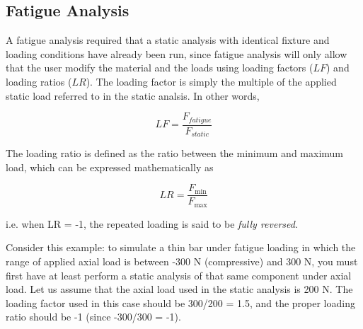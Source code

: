 \documentclass[
10pt,
a4paper,
openany,
svgnames,
]{book}
\begin{document}
\subsection{Fatigue Analysis}

A fatigue analysis required that a static analysis with identical fixture and loading conditions have already been run, since fatigue analysis will only allow that the user modify the material and the loads using loading factors ($LF$) and loading ratios ($LR$). The loading factor is simply the multiple of the applied static load referred to in the static analsis. In other words,

\begin{equation}
  LF = \frac{F_{fatigue}}{F_{static}}
\end{equation}

The loading ratio is defined as the ratio between the minimum and maximum load, which can be expressed mathematically as

\begin{equation}
  LR = \frac{F_{\min}}{F_{\max }}
\end{equation}

i.e. when LR = -1, the repeated loading is said to be \emph{fully reversed}.

 Consider this example: to simulate a thin bar under fatigue loading in which the range of applied axial load is between -300 N (compressive) and 300 N, you must first have at least perform a static analysis of that same component under axial load. Let us assume that the axial load used in the static analysis is 200 N. The loading factor used in this case should be 300/200 = 1.5, and the proper loading ratio should be -1 (since -300/300 = -1).
\end{document}
